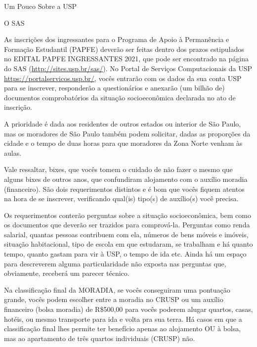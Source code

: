 \begin{secao}{Um Pouco Sobre a USP}
\begin{subsecao}{O SAS}


As inscrições dos ingressantes para o Programa de Apoio à Permanência e Formação Estudantil (PAPFE)
deverão ser feitas dentro dos prazos estipulados no EDITAL PAPFE INGRESSANTES 2021, que pode 
ser encontrado na página do SAS (\url{http://sites.usp.br/sas/}). No 
Portal de Serviços Computacionais da USP \url{https://portalservicos.usp.br/}, vocês entrarão 
com os dados da sua conta USP para se inscrever, responderão a questionários e anexarão (um bilhão de) 
documentos comprobatórios da situação socioeconômica declarada no ato de inscrição.

A prioridade é dada aos residentes de outros estados ou interior de São Paulo,
mas os moradores de São Paulo também podem solicitar, dadas as proporções da
cidade e o tempo de duas horas para que moradores da Zona Norte venham às aulas.

Vale ressaltar, bixes, que vocês tomem o cuidado de não fazer o mesmo que alguns
bixes de outros anos, que confundiram alojamento com o auxílio moradia (financeiro). São dois
requerimentos distintos e é bom que vocês fiquem atentos na hora de se inscrever, verificando
qual(is) tipo(s) de auxílio(s) você precisa.

Os requerimentos conterão perguntas sobre a situação socioeconômica, bem como os
documentos que deverão ser trazidos para comprová-la. Perguntas como renda
salarial, quantas pessoas contribuem com ela, números de bens móveis e imóveis,
situação habitacional, tipo de escola em que estudaram, se trabalham e há quanto
tempo, quanto gastam para vir à USP, o tempo de ida etc. Ainda há um espaço
para descreverem alguma particularidade não exposta nas perguntas que, obviamente,
receberá um parecer técnico.

Na classificação final da MORADIA, se vocês conseguiram uma pontuação grande, vocês
podem escolher entre a moradia no CRUSP ou um auxílio financeiro (bolsa moradia)
de R\$500,00 para vocês poderem alugar quartos, casas, hotéis, ou mesmo transporte
para ida e volta pra sua terra. Há casos em que a classificação final lhes
permite ter benefício apenas ao alojamento OU à bolsa, mas ao apartamento de
três quartos individuais (CRUSP) não.


\end{subsecao}
\end{secao}
